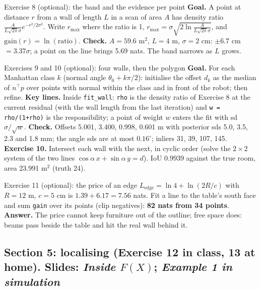 \documentclass[11pt]{article}
\begin{document}
\begin{labhelp}{Exercise 8 (optional): the band and the evidence per point}
\textbf{Goal.} A point at distance $r$ from a wall of length $L$ in a scan of area $A$ has density ratio $\frac{A}{L\sqrt{2\pi}\sigma}e^{-r^2/2\sigma^2}$. Write $r_{\max}$ where the ratio is 1, $r_{\max}=\sigma\sqrt{2\ln\frac{A}{L\sqrt{2\pi}\sigma}}$, and $\mathrm{gain}(r)=\ln(\text{ratio})$. \textbf{Check.} $A=59.6$ m$^2$, $L=4$ m, $\sigma=2$ cm: $\pm6.7$ cm $=3.37\sigma$; a point on the line brings 5.69 nats. The band narrows as $L$ grows.
\end{labhelp}

\begin{labhelp}{Exercises 9 and 10 (optional): four walls, then the polygon}
\textbf{Goal.} For each Manhattan class $k$ (normal angle $\theta_0+k\pi/2$): initialise the offset $d_k$ as the median of $n^\top p$ over points with normal within the class and in front of the robot; then refine. \textbf{Key lines.} Inside \texttt{fit\_wall}: \texttt{rho} is the density ratio of Exercise 8 at the current residual (with the wall length from the last iteration) and \texttt{w = rho/(1+rho)} is the responsibility; a point of weight $w$ enters the fit with sd $\sigma/\sqrt w$. \textbf{Check.} Offsets 5.001, 3.400, 0.998, 0.601 m with posterior sds 5.0, 3.5, 2.3 and 1.8 mm; the angle sds are at most $0.16^\circ$; inliers 31, 39, 107, 145. \textbf{Exercise 10.} Intersect each wall with the next, in cyclic order (solve the $2\times2$ system of the two lines $\cos\alpha\,x+\sin\alpha\,y=d$). IoU 0.9939 against the true room, area 23.991 m$^2$ (truth 24).
\end{labhelp}

\begin{labhelp}{Exercise 11 (optional): the price of an edge}
$L_{\text{edge}}=\ln4+\ln(2R/c)$ with $R=12$ m, $c=5$ cm is $1.39+6.17=7.56$ nats. Fit a line to the table's south face and sum \texttt{gain} over its points (clip negatives): \textbf{82 nats from 34 points}. \textbf{Answer.} The price cannot keep furniture out of the outline; free space does: beams pass beside the table and hit the real wall behind it.
\end{labhelp}

\subsection*{Section 5: localising (Exercise 12 in class, 13 at home). Slides: \emph{Inside $F(X)$}; \emph{Example 1 in simulation}}
\end{document}
